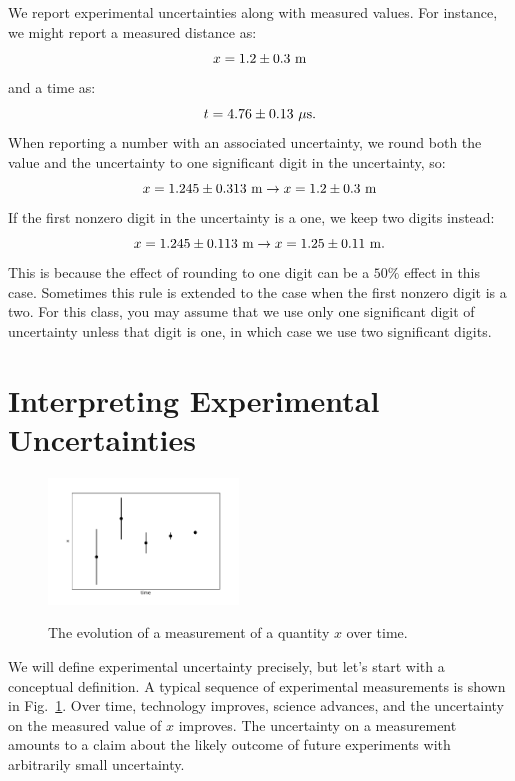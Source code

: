 \documentclass[12pt,oneside]{book}
\begin{document}
We report experimental uncertainties along with measured values.  For
instance, we might report a measured distance as:
\begin{displaymath}
x = 1.2 \pm 0.3~\rm m
\end{displaymath}
and a time as:
\begin{displaymath}
t = 4.76 \pm 0.13~\rm \mu s.
\end{displaymath}
When reporting a number with an associated uncertainty, we round both
the value and the uncertainty to one significant digit in the
uncertainty, so:
\begin{displaymath}
x = 1.245 \pm 0.313~{\rm m} \to x = 1.2 \pm 0.3~{\rm m} 
\end{displaymath}
If the first nonzero digit in the uncertainty is a one, we keep two digits instead:
\begin{displaymath}
x = 1.245 \pm 0.113~{\rm m} \to x = 1.25 \pm 0.11~{\rm m}.
\end{displaymath}
This is because the effect of rounding to one digit can be a $50\%$
effect in this case.  Sometimes this rule is extended to the case when
the first nonzero digit is a two.  For this class, you may assume that
we use only one significant digit of uncertainty unless that digit is
one, in which case we use two significant digits.


\section{Interpreting Experimental Uncertainties}

\begin{figure}[htbp]
\begin{center}
{\includegraphics[width=0.45\textwidth]{figs/measuretime.pdf}}
\end{center}
\caption{\label{fig:measuretime}  The evolution of a measurement of a quantity $x$ over time.}
\end{figure}

\noindent
We will define experimental uncertainty precisely, but let's start
with a conceptual definition.  A typical sequence of experimental
measurements is shown in Fig.~\ref{fig:measuretime}.  Over time,
technology improves, science advances, and the uncertainty on the
measured value of $x$ improves.  The uncertainty on a measurement
amounts to a claim about the likely outcome of future experiments with
arbitrarily small uncertainty.
\end{document}
